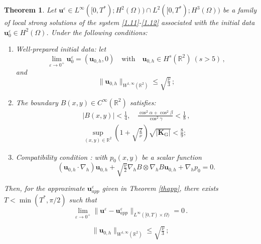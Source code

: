 \documentclass[10pt,a4paper]{amsart}
\newtheorem{theorem}{Theorem}
\begin{document}
\begin{theorem}\label{thm2}
	Let $\boldsymbol u^\varepsilon\in{L}^{\infty}([0,T^*);{H}^{2} (\Omega))\cap{L}^{2}([0,T^*);{H}^{3} (\Omega))$ be a family of local strong solutions of the system \eqref{1.11}-\eqref{1.12} associated with the initial data $\boldsymbol u_0^\varepsilon\in   H^{2}(\Omega)$. Under the following conditions:
	\begin{enumerate}[1.]
		\item{Well-prepared initial data:} 
		let 
		\begin{equation}\label{1.21}
			\mathop{\lim}\limits_{\varepsilon\rightarrow 0^+} \boldsymbol u^\varepsilon_0=
			({\boldsymbol u}_{0,h}, 0)
			\quad\text{with}\quad{\boldsymbol u}_{0,h}\in H^s(\mathbb{R}^2)~(s>5)\,,
		\end{equation}
		and
		\begin{equation}\label{1.26}   
		\lVert{\boldsymbol{u}}_{0,h}\rVert_{{W}^{1,\infty}(\mathbb{R}^2)}\leq\sqrt{\tfrac{\nu}{3}}\,;
		\end{equation}
		\item{The boundary $B(x,y)\in C^\infty(\mathbb{R}^2)$ satisfies:}
		\begin{align}
			|{B}(x,y)|<\tfrac14,\quad   \tfrac{\cos^2\alpha+\cos^2\beta}{\cos^2\gamma}<\tfrac{1}{8}\,,\label{1.23}\\
			\sup\limits_{(x,y)\in \mathbb{R}^2} (1+\sqrt{\tfrac{2}{\nu}})\sqrt{\big| \boldsymbol{K}_{\mathrm{G}}\big|} <\tfrac{8}{9};\label{1.24}	
		\end{align}
		\item{Compatibility condition : with  $p_0(x,y)$ be a scalar function}
	\begin{equation}\label{compatibility}
		({\boldsymbol{u}}_{0,h}\cdot\nabla_h){\boldsymbol{u}}_{0,h}
			+\sqrt{\tfrac{\nu}{2 }}
			\nabla_{ h}B\otimes\nabla_{ h}B
			{\boldsymbol u}_{0,h}
		 +\nabla_h p_0=0.
	\end{equation} 
	\end{enumerate}
	Then, for the approximate $\boldsymbol{u}_{app}^\varepsilon$ given in Theorem \ref{thapp}, there exists $T<\min(T^*,\pi/2)$ such that
	\begin{equation}\label{1.25} \lim\limits_{\varepsilon\rightarrow0^+}
		\lVert
		\boldsymbol{u}^\varepsilon
		-\boldsymbol{u}_{app}^\varepsilon 
		\rVert_{{L}^{\infty}([0,T)\times\Omega)}=0\,.
	\end{equation}	
\end{theorem}

		\begin{equation}   
		\lVert{\boldsymbol{u}}_{0,h}\rVert_{{W}^{1,\infty}(\mathbb{R}^2)}\leq\sqrt{\tfrac{\nu}{3}}\,;
		\end{equation}
\end{document}
